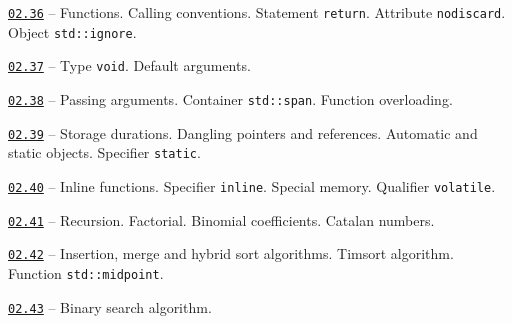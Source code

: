\documentclass[a4paper,12pt]{article}
\renewenvironment{itemize}
{
    \begin{list}{\labelitemi}
    {
      \setlength{\topsep}{0pt}
      \setlength{\partopsep}{0pt}
      \setlength{\parskip}{0pt}
      \setlength{\itemsep}{0pt}
      \setlength{\parsep}{0pt}
      \setlength{\leftmargin}{14.5pt}
    }
}{\end{list}}
\begin{document}
\begin{itemize}

    \item \href{https://github.com/i-s-m-mipt/Education/blob/master/projects/examples/source/02.36.cpp}{\texttt{02.36}} -- Functions. Calling conventions. Statement \lstinline{return}. Attribute \lstinline{nodiscard}. Object \lstinline{std::ignore}.

    \smallskip

    \item \href{https://github.com/i-s-m-mipt/Education/blob/master/projects/examples/source/02.37.cpp}{\texttt{02.37}} -- Type \lstinline{void}. Default arguments.

    \smallskip

    \item \href{https://github.com/i-s-m-mipt/Education/blob/master/projects/examples/source/02.38.cpp}{\texttt{02.38}} -- Passing arguments. Container \lstinline{std::span}. Function overloading.

    \smallskip

    \item \href{https://github.com/i-s-m-mipt/Education/blob/master/projects/examples/source/02.39.cpp}{\texttt{02.39}} -- Storage durations. Dangling pointers and references. Automatic and static objects. Specifier \lstinline{static}.

    \smallskip
    
    \item \href{https://github.com/i-s-m-mipt/Education/blob/master/projects/examples/source/02.40.cpp}{\texttt{02.40}} -- Inline functions. Specifier \lstinline{inline}. Special memory. Qualifier \lstinline{volatile}.

    \smallskip

    \item \href{https://github.com/i-s-m-mipt/Education/blob/master/projects/examples/source/02.41.cpp}{\texttt{02.41}} -- Recursion. Factorial. Binomial coefficients. Catalan numbers.

    \smallskip

    \item \href{https://github.com/i-s-m-mipt/Education/blob/master/projects/examples/source/02.42.cpp}{\texttt{02.42}} -- Insertion, merge and hybrid sort algorithms. Timsort algorithm. Function \lstinline{std::midpoint}.

    \smallskip

    \item \href{https://github.com/i-s-m-mipt/Education/blob/master/projects/examples/source/02.43.cpp}{\texttt{02.43}} -- Binary search algorithm.

\end{itemize}
\end{document}
